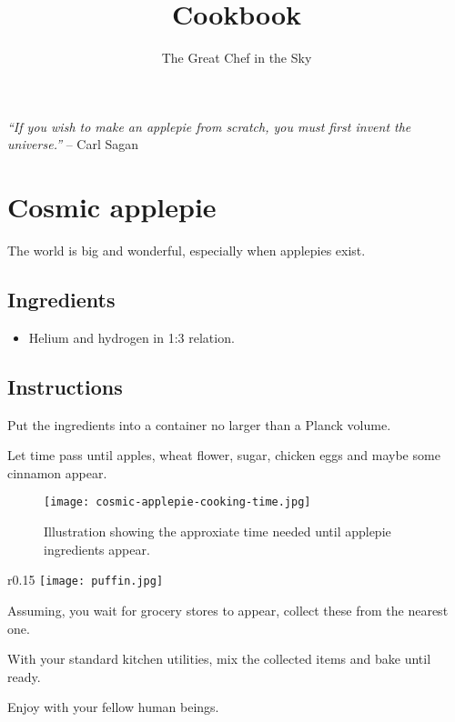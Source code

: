 \documentclass[11pt]{article}
\title{Cookbook}
\author{The Great Chef in the Sky}
\begin{document}
\maketitle

\begin{displayquote}
\emph{``If you wish to make an applepie from scratch, you must first invent the universe.''}
-- Carl Sagan
\end{displayquote}

\section*{Cosmic applepie}

The world is big and wonderful, especially when applepies exist.

\subsection*{Ingredients}

\begin{itemize}
\item Helium and hydrogen in 1:3 relation.
\end{itemize}

\subsection*{Instructions}

Put the ingredients into a container no larger than a Planck volume.

Let time pass until apples, wheat flower, sugar, chicken eggs and maybe some cinnamon appear.

\begin{figure}[h]
\centering
\texttt{[image: cosmic-applepie-cooking-time.jpg]}
\caption{Illustration showing the approxiate time needed until applepie ingredients appear.}
\end{figure}

\begin{wrapfigure}{r}{0.15\textwidth}
    \centering
    \texttt{[image: puffin.jpg]}
\end{wrapfigure}

Assuming, you wait for grocery stores to appear, collect these from the nearest one.

With your standard kitchen utilities, mix the collected items and bake until ready.

Enjoy with your fellow human beings.
\end{document}
